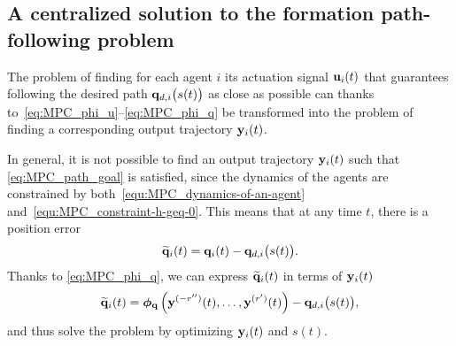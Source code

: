 \subsection{A centralized solution to the formation path-following problem}
\label{ssec:MPC_centralized}



The problem of finding for each agent $i$ its actuation signal $\mathbf{u}_i(t)$ that guarantees following the desired path $\mathbf{q}_{d,i} \big( s(t) \big)$ as close as possible can thanks to~\eqref{eq:MPC_phi_u}--\eqref{eq:MPC_phi_q} be transformed into the problem of finding a corresponding output trajectory $\mathbf{y}_i(t)$.

In general, it is not possible to find an output trajectory $\mathbf{y}_i(t)$ such that \eqref{eq:MPC_path_goal} is satisfied, since the dynamics of the agents are constrained by both~\eqref{equ:MPC_dynamics-of-an-agent} and~\eqref{equ:MPC_constraint-h-geq-0}. This means that at any time $t$, there is a position error
%
\begin{equation}
    \widetilde{\mathbf{q}}_i(t)
    =
    \mathbf{q}_i(t)
    -
    \mathbf{q}_{d,i} \big( s(t) \big) .
    \label{eq:MPC_q_tilde}
\end{equation}
%
Thanks to \eqref{eq:MPC_phi_q}, we can express $\widetilde{\mathbf{q}}_i(t)$ in terms of $\mathbf{y}_i(t)$
\begin{equation}
    \widetilde{\mathbf{q}}_i(t)
    =
    \bm{\phi}_{\mathbf{q}}\left(\mathbf{y}^{(-r'')}(t), \ldots, \mathbf{y}^{(r')}(t)\right)
    -
    \mathbf{q}_{d,i} \big( s(t) \big), \label{eq:MPC_y_tilde}
\end{equation}
and thus solve the problem by optimizing $\mathbf{y}_i(t)$ and $s(t)$.

